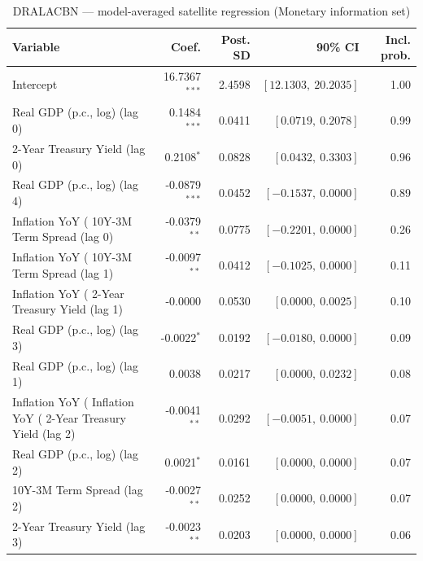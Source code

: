 \begin{table}[!htbp]
\centering
\caption{DRALACBN --- model-averaged satellite regression (Monetary information set)}
\label{tab:dralacbn_monetary_bma_satellite}
\begin{tabular}{lrrrr}
\toprule
Variable & Coef. & Post. SD & 90\% CI & Incl. prob. \\
\midrule
Intercept & 16.7367$^{***}$ & 2.4598 & $[12.1303,\ 20.2035]$ & 1.00 \\
Real GDP (p.c., log) (lag 0) & 0.1484$^{***}$ & 0.0411 & $[0.0719,\ 0.2078]$ & 0.99 \\
2-Year Treasury Yield (lag 0) & 0.2108$^{*}$ & 0.0828 & $[0.0432,\ 0.3303]$ & 0.96 \\
Real GDP (p.c., log) (lag 4) & -0.0879$^{***}$ & 0.0452 & $[-0.1537,\ 0.0000]$ & 0.89 \\
Inflation YoY (%
10Y-3M Term Spread (lag 0) & -0.0379$^{**}$ & 0.0775 & $[-0.2201,\ 0.0000]$ & 0.26 \\
Inflation YoY (%
10Y-3M Term Spread (lag 1) & -0.0097$^{**}$ & 0.0412 & $[-0.1025,\ 0.0000]$ & 0.11 \\
Inflation YoY (%
2-Year Treasury Yield (lag 1) & -0.0000 & 0.0530 & $[0.0000,\ 0.0025]$ & 0.10 \\
Real GDP (p.c., log) (lag 3) & -0.0022$^{*}$ & 0.0192 & $[-0.0180,\ 0.0000]$ & 0.09 \\
Real GDP (p.c., log) (lag 1) & 0.0038 & 0.0217 & $[0.0000,\ 0.0232]$ & 0.08 \\
Inflation YoY (%
Inflation YoY (%
2-Year Treasury Yield (lag 2) & -0.0041$^{**}$ & 0.0292 & $[-0.0051,\ 0.0000]$ & 0.07 \\
Real GDP (p.c., log) (lag 2) & 0.0021$^{*}$ & 0.0161 & $[0.0000,\ 0.0000]$ & 0.07 \\
10Y-3M Term Spread (lag 2) & -0.0027$^{**}$ & 0.0252 & $[0.0000,\ 0.0000]$ & 0.07 \\
2-Year Treasury Yield (lag 3) & -0.0023$^{**}$ & 0.0203 & $[0.0000,\ 0.0000]$ & 0.06 \\

\end{tabular}
\end{table}
